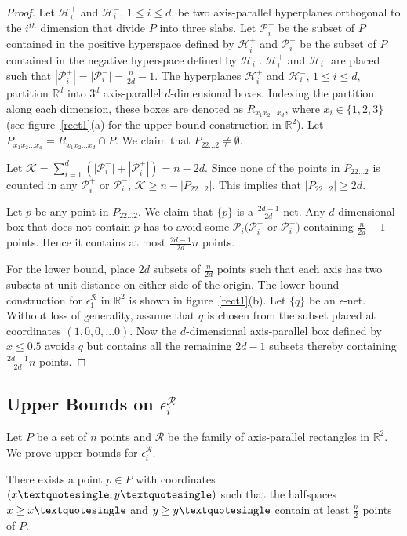 \begin{proof}
Let $\mathcal{H}_i^+$ and $\mathcal{H}_i^-$, $1\leq i \leq d$, be two axis-parallel hyperplanes orthogonal to the $i^{th}$ dimension that divide $P$ into three slabs. Let $\mathcal{P}_i^+ $ be the subset of $P$ contained in the positive hyperspace defined by   $\mathcal{H}_i^+$ and $\mathcal{P}_i^- $ be the subset of $P$ contained in the negative hyperspace defined by   $\mathcal{H}_i^-$. $\mathcal{H}_i^+$ and $\mathcal{H}_i^-$ are placed such that $|\mathcal{P}_i^+| = |\mathcal{P}_i^-| = \frac{n}{2d}-1$. The hyperplanes $\mathcal{H}_i^+$ and $\mathcal{H}_i^-$, $1\leq i \leq d$, partition $\mathbb{R}^d$ into $3^d$
axis-parallel $d$-dimensional boxes. Indexing the partition along each
dimension, these boxes are denoted as $R_{x_1 x_2 ... x_d}$,
where $x_i \in \{1,2,3\}$ (see figure~\ref{rect1}(a) for the upper bound construction in $\mathbb{R}^2$). Let $P_{x_1 x_2 ... x_d} =R_{x_1 x_2 ... x_d} \cap P$. We claim that $P_{22...2} \ne \emptyset$. 

Let $\mathcal{K} = \sum\limits_{i=1}^d (|\mathcal{P}_i^-| + |\mathcal{P}_i^+|) =
n-2d$. Since none of the points in  $P_{22...2}$ is counted in any
$\mathcal{P}_i^+$ or $\mathcal{P}_i^-$, $\mathcal{K} \ge n - |P_{22...2}|$. This implies that
$|P_{22...2}| \ge 2d$. 

Let $p$ be any point in $P_{22...2}$. We claim that
$\{p\}$ is a $\frac{2d-1}{2d}$-net. Any $d$-dimensional
box that does not contain $p$ has to avoid some $\mathcal{P}_i(\mathcal{P}_i^+$ or $\mathcal{P}_i^-)$ containing
$\frac{n}{2d}-1$ points. Hence it contains at most $\frac{2d-1}{2d} n$ points.

For the lower bound, place $2d $ subsets of $\frac{n}{2d}$ points such that each axis has two subsets at unit distance on either side of the origin. The lower bound construction for $\epsilon_1^\mathcal{R}$ in $\mathbb{R}^2$ is shown in figure~\ref{rect1}(b). Let $\{q\}$ be an $\epsilon$-net. Without loss of generality, assume that $q$ is chosen from the subset placed at coordinates $(1,0,0,...0)$.
Now the $d$-dimensional axis-parallel box defined by $x \le 0.5$ avoids
$q$ but contains all the
remaining $2d-1$ subsets thereby containing $\frac{2d-1}{2d}n$ points.



\end{proof}



\noindent

\subsection{Upper Bounds on $\epsilon_i^{\mathcal{R}}$}
\noindent Let $P$ be a set of $n$ points and $\mathcal{R}$ be the family of axis-parallel rectangles in $\mathbb{R}^2$. We prove upper bounds for $\epsilon_i^{\mathcal{R}}$.
\begin{lem}\label{halfhalf}
There exists a point $p\in P$ with coordinates
$(x\textquotesingle,y\textquotesingle)$ such that the
halfspaces $x \geq x\textquotesingle$ and $y \geq y\textquotesingle $ contain at least $\frac{n}{2}$ points of $P$.
\end{lem}

